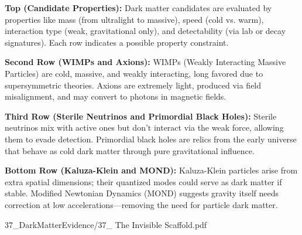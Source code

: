 \begin{SideNotePage}{
  \textbf{Top (Candidate Properties):}  
  Dark matter candidates are evaluated by properties like mass (from ultralight to massive), speed (cold vs. warm), interaction type (weak, gravitational only), and detectability (via lab or decay signatures). Each row indicates a possible property constraint. \par

  \textbf{Second Row (WIMPs and Axions):}  
  WIMPs (Weakly Interacting Massive Particles) are cold, massive, and weakly interacting, long favored due to supersymmetric theories. Axions are extremely light, produced via field misalignment, and may convert to photons in magnetic fields. \par

  \textbf{Third Row (Sterile Neutrinos and Primordial Black Holes):}  
  Sterile neutrinos mix with active ones but don’t interact via the weak force, allowing them to evade detection. Primordial black holes are relics from the early universe that behave as cold dark matter through pure gravitational influence. \par

  \textbf{Bottom Row (Kaluza-Klein and MOND):}  
  Kaluza-Klein particles arise from extra spatial dimensions; their quantized modes could serve as dark matter if stable. Modified Newtonian Dynamics (MOND) suggests gravity itself needs correction at low accelerations—removing the need for particle dark matter. \par

}{37_DarkMatterEvidence/37_ The Invisible Scaffold.pdf}
\end{SideNotePage}
